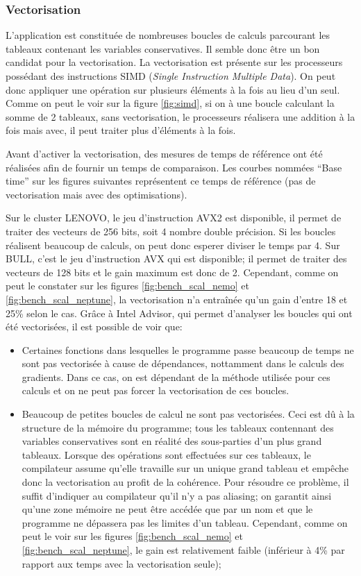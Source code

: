 \subsubsection{Vectorisation}\label{fig:vecto}
L'application est constituée de nombreuses boucles de calculs parcourant les tableaux contenant les variables conservatives. Il semble donc être un bon candidat pour la vectorisation. La vectorisation est présente sur les processeurs possédant des instructions SIMD (\textit{Single Instruction Multiple Data}). On peut donc appliquer une opération sur plusieurs éléments à la fois au lieu d'un seul. Comme on peut le voir sur la figure \ref{fig:simd}, si on à une boucle calculant la somme de 2 tableaux, sans vectorisation, le processeurs réalisera une addition à la fois mais avec, il peut traiter plus d'éléments à la fois.

Avant d'activer la vectorisation, des mesures de temps de référence ont été réalisées afin de fournir un temps de comparaison. Les courbes nommées ``Base time'' sur les figures suivantes représentent ce temps de référence (pas de vectorisation mais avec des optimisations).

Sur le cluster LENOVO, le jeu d'instruction AVX2 est disponible, il permet de traiter des vecteurs de 256 bits, soit 4 nombre double précision. Si les boucles réalisent beaucoup de calculs, on peut donc esperer diviser le temps par 4. Sur BULL, c'est le jeu d'instruction AVX qui est disponible; il permet de traiter des vecteurs de 128 bits et le gain maximum est donc de 2. Cependant, comme on peut le constater sur les figures \ref{fig:bench_scal_nemo} et \ref{fig:bench_scal_neptune}, la vectorisation n'a entraînée qu'un gain d'entre 18 et 25\% selon le cas. Grâce à Intel Advisor, qui permet d'analyser les boucles qui ont été vectorisées, il est possible de voir que:
\begin{itemize}
\item Certaines fonctions dans lesquelles le programme passe beaucoup de temps ne sont pas vectorisée à cause de dépendances, nottamment dans le calculs des gradients. Dans ce cas, on est dépendant de la méthode utilisée pour ces calculs et on ne peut pas forcer la vectorisation de ces boucles.
\item Beaucoup de petites boucles de calcul ne sont pas vectorisées. Ceci est dû à la structure de la mémoire du programme; tous les tableaux contennant des variables conservatives sont en réalité des sous-parties d'un plus grand tableaux. Lorsque des opérations sont effectuées sur ces tableaux, le compilateur assume qu'elle travaille sur un unique grand tableau et empêche donc la vectorisation au profit de la cohérence. Pour résoudre ce problème, il suffit d'indiquer au compilateur qu'il n'y a pas aliasing; on garantit ainsi qu'une zone mémoire ne peut être accédée que par un nom et que le programme ne dépassera pas les limites d'un tableau. Cependant, comme on peut le voir sur les figures \ref{fig:bench_scal_nemo} et \ref{fig:bench_scal_neptune}, le gain est relativement faible (inférieur à 4\% par rapport aux temps avec la vectorisation seule); 
\end{itemize}



